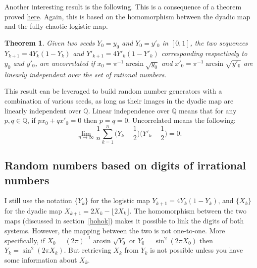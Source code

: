 \documentclass[oneside,10pt]{book}
\newtheorem{theorem}{Theorem}[section]
\begin{document}
Another interesting result is the following. This is a consequence of  a theorem proved 
\href{https://stats.stackexchange.com/questions/422354/correlations-between-two-sequences-of-irrational-numbers}{here}. Again, this is based on the homomorphism between the dyadic map and the fully chaotic logistic map. 
\begin{theorem}

Given two seeds $Y_0=y_0$ and $Y_0=y'_0$ in $[0, 1]$, the two sequences 
$Y_{k+1}=4Y_k(1-Y_k)$ and $Y'_{k+1}=4Y'_k(1-Y'_k)$ corresponding respectively to $y_0$ and $y'_0$, are uncorrelated if 
$x_0=\pi^{-1}\arcsin\sqrt{y_0}$ 
and $x'_0=\pi^{-1}\arcsin\sqrt{y'_0}$ are linearly independent over the set of rational numbers.

\end{theorem}
This result can be leveraged to build \textcolor{index}{random number generators} with a combination of various seeds, as long as their images in the dyadic map 
are linearly independent over $\mathbb{Q}$. Linear independence over $\mathbb{Q}$ means that for any $p,q\in\mathbb{Q}$, if $p x_0 + q x'_0=0$ then $p=q=0$.
Uncorrelated means the following:
$$
\lim_{n\rightarrow\infty}\frac{1}{n}\sum_{k=1}^n  \Big(Y_k-\frac{1}{2}\Big)\Big(Y'_k-\frac{1}{2}\Big) = 0.
$$



\subsection{Random numbers based on digits of irrational numbers}\label{puutrew}

I still use the notation $\{Y_k\}$ for the logistic map $Y_{k+1}=4Y_k(1-Y_k)$, and $\{X_k\}$ for the 
dyadic map $X_{k+1}=2X_k- \lfloor 2X_k\rfloor$. The homomorphism between the two maps
 (discussed in section~\ref{hohok}) makes it possible to link the digits of both systems. However, the mapping between the two is not one-to-one. More specifically, if $X_0 = (2\pi)^{-1}\arcsin \sqrt{Y_0}$ or $Y_0 = \sin^2(2\pi X_0)$ then $Y_k = \sin^2(2\pi X_k)$. But retrieving
 $X_k$ from $Y_k$ is not possible unless you have some information about $X_k$. 
\end{document}
